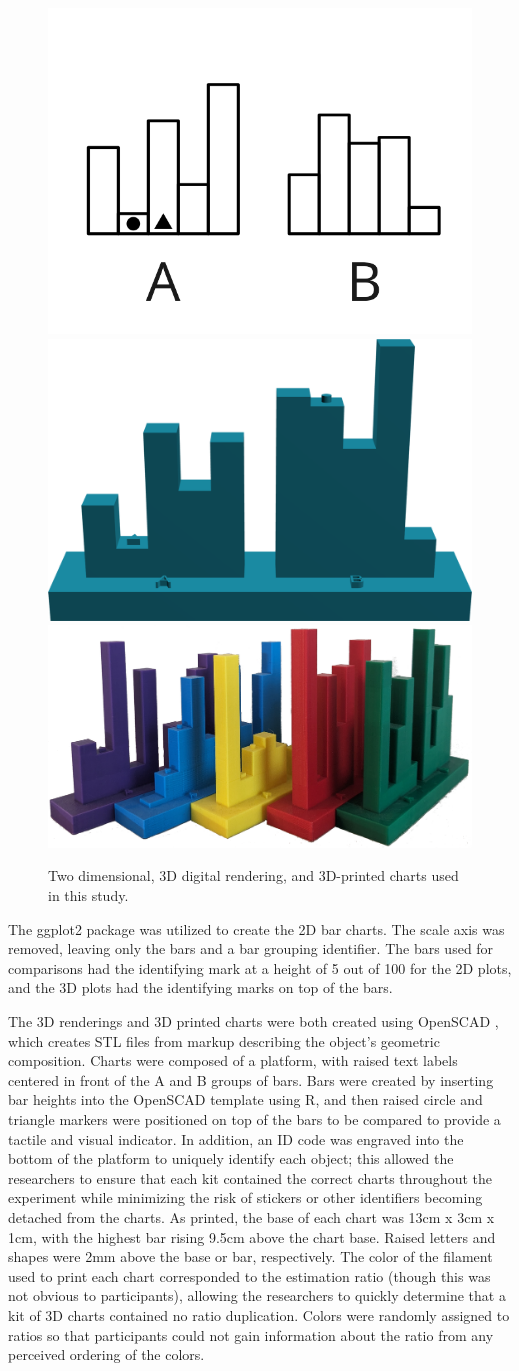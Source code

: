 \documentclass[letterpaper,inpress,dvipsnames]{jdsart}
\begin{document}
\begin{figure}
\includegraphics[width=0.3\linewidth]{_images/Type1-Rep01} \includegraphics[width=0.3\linewidth]{_images/RenderedChart} \includegraphics[width=0.35\linewidth]{_images/Kit_of_charts} \caption{Two dimensional, 3D digital rendering, and 3D-printed charts used in this study.}\label{fig:plotTypes}
\end{figure}

The ggplot2 \citep{ggplot2} package was utilized to create the 2D bar charts.
The scale axis was removed, leaving only the bars and a bar grouping identifier.
The bars used for comparisons had the identifying mark at a height of 5 out of 100 for the 2D plots, and the 3D plots had the identifying marks on top of the bars.

The 3D renderings and 3D printed charts were both created using OpenSCAD \citep{kintelOpenSCADDocumentation2023}, which creates STL files from markup describing the object's geometric composition.
Charts were composed of a platform, with raised text labels centered in front of the A and B groups of bars. Bars were created by inserting bar heights into the OpenSCAD template using R, and then raised circle and triangle markers were positioned on top of the bars to be compared to provide a tactile and visual indicator.
In addition, an ID code was engraved into the bottom of the platform to uniquely identify each object; this allowed the researchers to ensure that each kit contained the correct charts throughout the experiment while minimizing the risk of stickers or other identifiers becoming detached from the charts.
As printed, the base of each chart was 13cm x 3cm x 1cm, with the highest bar rising 9.5cm above the chart base.
Raised letters and shapes were 2mm above the base or bar, respectively.
The color of the filament used to print each chart corresponded to the estimation ratio (though this was not obvious to participants), allowing the researchers to quickly determine that a kit of 3D charts contained no ratio duplication.
Colors were randomly assigned to ratios so that participants could not gain information about the ratio from any perceived ordering of the colors.
\end{document}
